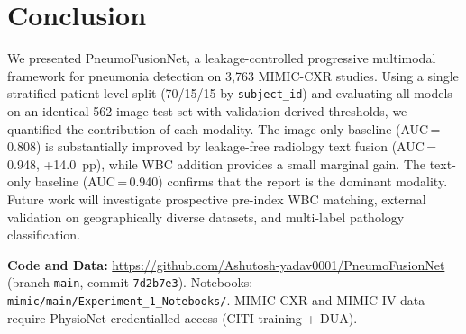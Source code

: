 \documentclass[conference]{IEEEtran}
\begin{document}
\section{\textcolor{aideep}{Conclusion}}

We presented PneumoFusionNet, a leakage-controlled progressive multimodal framework for pneumonia detection on 3{,}763 MIMIC-CXR studies. Using a single stratified patient-level split (70/15/15 by \texttt{subject\_id}) and evaluating all models on an identical 562-image test set with validation-derived thresholds, we quantified the contribution of each modality. The image-only baseline (AUC\,=\,0.808) is substantially improved by leakage-free radiology text fusion (AUC\,=\,0.948, +14.0~pp), while WBC addition provides a small marginal gain. The text-only baseline (AUC\,=\,0.940) confirms that the report is the dominant modality. Future work will investigate prospective pre-index WBC matching, external validation on geographically diverse datasets, and multi-label pathology classification.

\vspace{4pt}
\noindent\textbf{Code and Data:} \url{https://github.com/Ashutosh-yadav0001/PneumoFusionNet} (branch \texttt{main}, commit \texttt{7d2b7e3}). Notebooks: \texttt{mimic/main/Experiment\_1\_Notebooks/}. MIMIC-CXR and MIMIC-IV data require PhysioNet credentialled access (CITI training + DUA).
\end{document}
